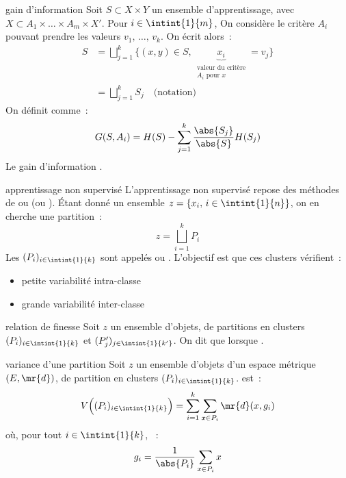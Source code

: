 \begin{adjustwidth}{-3cm}{-3cm}
\begin{definition}{5.7}{gain d'information}
    Soit $S \subset X \times Y$ un ensemble d'apprentissage, avec $X \subset A_1 \times \dots \times A_m \times X'$. Pour $i \in \intint{1}{m}$, On considère le critère $A_i$ pouvant prendre les valeurs $v_1,\, \dots,\, v_k$. On écrit alors~:
        \begin{align*}S &= \bigsqcup_{j=1}^k \big\{(x,y) \in S,\, \underbrace{x_i}_{\substack{\text{valeur du critère} \\A_i \text{ pour } x}} = v_j\big\} \\
            &= \bigsqcup_{j=1}^k S_j \quad \text{(notation)}
        \end{align*}
    On définit  comme~:
    $$G(S,A_i) = H(S) - \sum_{j=1}^{k} \frac{\abs{S_j}}{\abs{S}} H(S_j)$$
    Le gain d'information .
\end{definition}

\begin{definition}{5.8}{apprentissage non supervisé}
    L'apprentissage non supervisé repose des méthodes de  ou (ou ). Étant donné un ensemble $z = \{x_i,\, i \in \intint{1}{n}\}$, on en cherche une partition~:
    $$z = \bigsqcup_{i=1}^kP_i$$
    Les $(P_i)_{i \in \intint{1}{k}}$ sont appelés  ou . L'objectif est que ces clusters vérifient~:
    \begin{itemize}
        \item petite variabilité intra-classe
        \item grande variabilité inter-classe
    \end{itemize}
\end{definition}

\begin{definition}{5.9}{relation de finesse}
    Soit $z$ un ensemble d'objets, de partitions en clusters $(P_i)_{i\in\intint{1}{k}}$ et $(P_j')_{j\in\intint{1}{k'}}$. On dit que   lorsque .
\end{definition}

\begin{definition}{5.10}{variance d'une partition}
    Soit $z$ un ensemble d'objets d'un espace métrique $(E, \mr{d})$, de partition en clusters $(P_i)_{i\in\intint{1}{k}}$.  est~:
    $$V\Big((P_i)_{i\in\intint{1}{k}}\Big) = \sum_{i=1}^{k}\sum_{x \in P_i}\mr{d}(x,g_i)$$
    où, pour tout $i \in \intint{1}{k}$, ~:
    $$g_i = \frac{1}{\abs{P_i}}\sum_{x \in P_i}x$$
\end{definition}


\end{adjustwidth}

